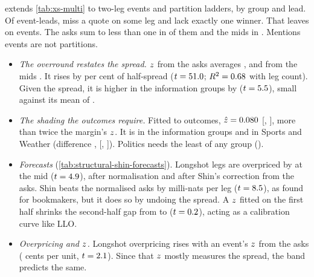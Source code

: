  extends \cref{tab:xs-multi} to two-leg events and partition ladders, by group and
lead. Of \sdShinAllEventLeads{} event-leads, \sdShinIncomplete{} miss a quote on some leg and \sdShinNotOneYes{} lack
exactly one winner. That leaves \sdShinEventLeads{} on \sdShinUnits{} events. The asks sum to less than one in
\sdShinAskBelow{} of them and the mids in \sdShinMidBelow. Mentions events are not partitions.
\begin{itemize}
  \item \emph{The overround restates the spread.} $z$ from the asks averages \sdShinAllZask, and from the mids
  \sdShinAllZmid. It rises by \sdZregSpread{} per cent of half-spread ($t=51.0$; $R^2=0.68$ with leg
  count). Given the spread, it is higher in the information groups by \sdZregInfo{} ($t=5.5$), small
  against its mean of \sdShinAllZask.
  \item \emph{The shading the outcomes require.} Fitted to outcomes, $\hat{z}=0.080$
  [\sdShinAllZmlLo, \sdShinAllZmlHi], more than twice the margin's $z$. It is \sdZmlInfo{} in the information
  groups and \sdZmlPublic{} in Sports and Weather (difference \sdZmlDiff, [\sdZmlDiffLo, \sdZmlDiffHi]). Politics
  needs the least of any group (\sdShinPoliticsZml).
  \item \emph{Forecasts} (\cref{tab:structural-shin-forecasts}). Longshot legs are overpriced by \sdLsAllMid\cents{}
  at the mid ($t=4.9$), \sdLsAllNorm{} after normalisation and \sdLsAllShinAsk{} after Shin's correction from
  the asks. Shin beats the normalised asks by \sdScAllShinAsk{} milli-nats per leg ($t=8.5$), as
  \citet{strumbelj2014} found for bookmakers, but it does so by undoing the spread. A $z$ fitted on the first
  half shrinks the second-half gap from \sdLsTestMid{} to \sdLsTestShinFit\cents{} ($t=0.2$), acting
  as a calibration curve like LLO.
  \item \emph{Overpricing and $z$.} Longshot overpricing rises with an event's $z$ from the asks
  (\sdLsOnZ{} cents per unit, $t=2.1$). Since that $z$ mostly measures the spread, the band predicts the
  same.
\end{itemize}

